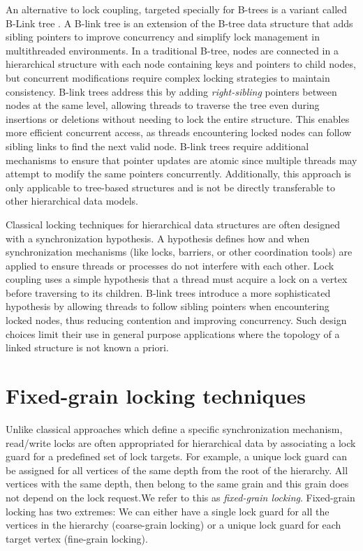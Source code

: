 An alternative to lock coupling, targeted specially for B-trees is a variant called B-Link tree \cite{LehmanY81}. A B-link tree is an extension of the B-tree data structure that adds sibling pointers to improve concurrency and simplify lock management in multithreaded environments. In a traditional B-tree, nodes are connected in a hierarchical structure with each node containing keys and pointers to child nodes, but concurrent modifications require complex locking strategies to maintain consistency. B-link trees address this by adding \emph{right-sibling} pointers between nodes at the same level, allowing threads to traverse the tree even during insertions or deletions without needing to lock the entire structure. This enables more efficient concurrent access, as threads encountering locked nodes can follow sibling links to find the next valid node. B-link trees require additional mechanisms to ensure that pointer updates are atomic since multiple threads may attempt to modify the same pointers concurrently. Additionally, this approach is only applicable to tree-based structures and is not be directly transferable to other hierarchical data models.


Classical locking techniques for hierarchical data structures are often designed with a synchronization hypothesis. A hypothesis defines how and when synchronization mechanisms (like locks, barriers, or other coordination tools) are applied to ensure threads or processes do not interfere with each other. Lock coupling uses a simple hypothesis that a thread must acquire a lock on a vertex before traversing to its children. B-link trees introduce a more sophisticated hypothesis by allowing threads to follow sibling pointers when encountering locked nodes, thus reducing contention and improving concurrency. Such design choices limit their use in general purpose applications where the topology of a linked structure is not known a priori. 

\section{Fixed-grain locking techniques}
Unlike classical approaches which define a specific synchronization mechanism, read/write locks are often appropriated for hierarchical data by associating a lock guard for a predefined set of lock targets. For example, a unique lock guard can be assigned for all vertices of the same depth from the root of the hierarchy. All vertices with the same depth, then belong to the same grain and this grain does not depend on the lock request.We refer to this as \emph{fixed-grain locking}. 
Fixed-grain locking has two extremes: We can either have a single lock guard for all the vertices in the hierarchy (coarse-grain locking) or a unique lock guard for each target vertex (fine-grain locking).


